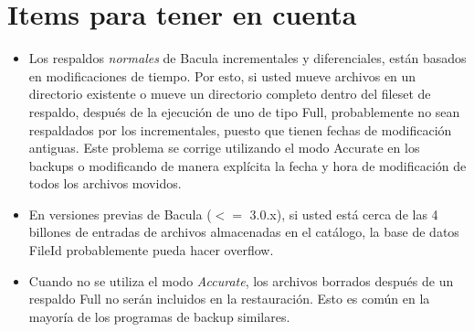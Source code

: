 \section{Items para tener en cuenta}
\begin{itemize}
\item Los respaldos \textsl{normales} de Bacula incrementales y diferenciales, están basados en 
  modificaciones de tiempo. Por esto, si usted mueve archivos en un directorio existente
  o mueve un directorio completo dentro del fileset de respaldo, después de la ejecución
  de uno de tipo Full, probablemente no sean respaldados por los incrementales, puesto
  que tienen fechas de modificación antiguas. Este problema se corrige utilizando el
  modo Accurate en los backups o modificando de manera explícita la fecha y hora de
  modificación de todos los archivos movidos.
\item En versiones previas de Bacula ($<=$ 3.0.x), si usted está cerca de las 4 billones
  de entradas de archivos almacenadas en el catálogo, la base de datos FileId probablemente
  pueda hacer overflow.
\item Cuando no se utiliza el modo \textsl{Accurate}, los archivos borrados después de un respaldo
  Full no serán incluidos en la restauración. Esto es común en la mayoría de los programas
  de backup similares.
\end{itemize}
